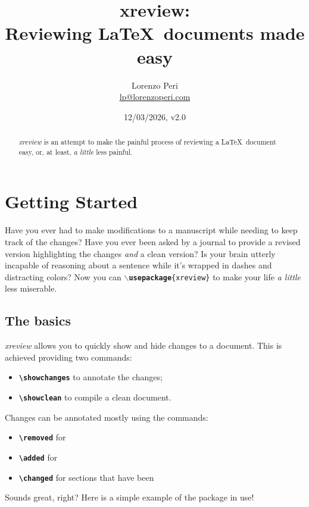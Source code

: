 \documentclass[a4paper]{ltxdoc}
\title{\textbf{xreview}: \\ \Large{Reviewing
\LaTeX~documents made easy}}
\author{Lorenzo Peri\\\textcolor{blue}{\href{mailto:lp@lorenzoperi.com}{lp@lorenzoperi.com}}}
\date{12/03/2026, v2.0}
\newcommand{\writecommand}[1]{\texttt{\textbf{{\textbackslash#1}}}}
\begin{document}
\maketitle

\begin{abstract}
    \textit{xreview} is an attempt to make the painful process of reviewing a \LaTeX~document easy, or, at least, \textit{a little} less painful.
\end{abstract}

\tableofcontents

\section{Getting Started}

Have you ever had to make modifications to a manuscript while needing to keep track of the changes? Have you ever been asked by a journal to provide a revised version highlighting the changes \textit{and} a clean version? Is your brain utterly incapable of reasoning about a sentence while it's wrapped in dashes and distracting colors?
Now you can \texttt{\textbf{{$\backslash$usepackage}}\{xreview\}} to make your life \textit{a little} less miserable.

\subsection{The basics}

\textit{xreview} allows you to quickly show and hide changes to a document.
This is achieved providing two commands:
\begin{itemize}
    \item \writecommand{showchanges} to annotate the changes;
    \item \writecommand{showclean} to compile a clean document.
\end{itemize}

Changes can be annotated mostly using the commands:
\begin{itemize}
    \item \writecommand{removed} for 
    \item \writecommand{added} for 
    \item \writecommand{changed} for sections that have been 
\end{itemize}

Sounds great, right? Here is a simple example of the package in use!
\end{document}
